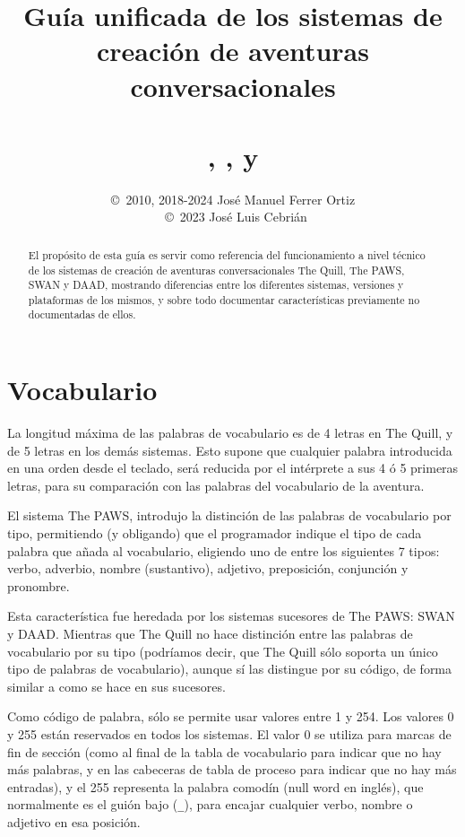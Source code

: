 \documentclass[11pt, a5paper]{article}
\title{Guía unificada de los sistemas de creación de aventuras conversacionales
       \\\ \\\Huge{\quill, \paw, \swan y \daad}}
\author{\copyright\ 2010, 2018-2024 José Manuel Ferrer Ortiz
       \\\ \copyright\ 2023 José Luis Cebrián}
\newcommand{\quill}{\textsf{The Quill}\xspace}
\newcommand{\paw}{\textsf{The PAWS}\xspace}
\newcommand{\swan}{\textsf{SWAN}\xspace}
\newcommand{\daad}{\textsf{DAAD}\xspace}
\begin{document}
\maketitle
\tableofcontents
\newpage

\begin{abstract}
El propósito de esta guía es servir como referencia del funcionamiento a nivel técnico de los sistemas de creación de aventuras conversacionales \quill, \paw, \swan y \daad, mostrando diferencias entre los diferentes sistemas, versiones y plataformas de los mismos, y sobre todo documentar características previamente no documentadas de ellos.
\end{abstract}

\section{Vocabulario}\label{vocab}

La longitud máxima de las palabras de vocabulario es de 4 letras en \quill, y de 5 letras en los demás sistemas. Esto supone que cualquier palabra introducida en una orden desde el teclado, será reducida por el intérprete a sus 4 ó 5 primeras letras, para su comparación con las palabras del vocabulario de la aventura.

El sistema \paw, introdujo la distinción de las palabras de vocabulario por tipo, permitiendo (y obligando) que el programador indique el tipo de cada palabra que añada al vocabulario, eligiendo uno de entre los siguientes 7 tipos: verbo, adverbio, nombre (sustantivo), adjetivo, preposición, conjunción y pronombre.

Esta característica fue heredada por los sistemas sucesores de \paw: \swan y \daad. Mientras que \quill no hace distinción entre las palabras de vocabulario por su tipo (podríamos decir, que \quill sólo soporta un único tipo de palabras de vocabulario), aunque sí las distingue por su código, de forma similar a como se hace en sus sucesores.

Como código de palabra, sólo se permite usar valores entre 1 y 254. Los valores 0 y 255 están reservados en todos los sistemas. El valor 0 se utiliza para marcas de fin de sección (como al final de la tabla de vocabulario para indicar que no hay más palabras, y en las cabeceras de tabla de proceso para indicar que no hay más entradas), y el 255 representa la palabra comodín (null word en inglés), que normalmente es el guión bajo (\texttt{\_}), para encajar cualquier verbo, nombre o adjetivo en esa posición.
\end{document}
